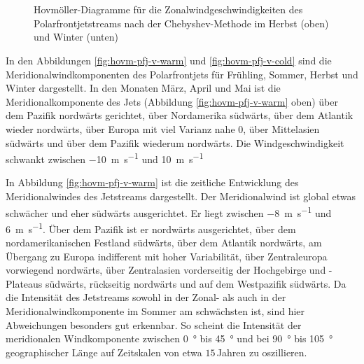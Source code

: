 \begin{figure}
  \centering
  \begin{minipage}{\textwidth}
    \centering
  \end{minipage} \\ 
    \begin{minipage}{\textwidth}
      \centering
  \end{minipage} \\ 
  \caption[Hovmöllerdiagramme des Zonalwinds des Polarfrontjets nach Chebyshev im Herbst und Winter]{Hovmöller-Diagramme für die Zonalwindgeschwindigkeiten des Polarfrontjetstreams nach der Chebyshev-Methode im Herbst (oben) und Winter (unten)} \label{fig:hovm-pfj-u-cold}
\end{figure}

In den Abbildungen \ref{fig:hovm-pfj-v-warm} und \ref{fig:hovm-pfj-v-cold} sind die Meridionalwindkomponenten des Polarfrontjets für Frühling, Sommer, Herbst und Winter dargestellt. In den Monaten März, April und Mai ist die Meridionalkomponente des Jets (Abbildung \ref{fig:hovm-pfj-v-warm} oben) über dem Pazifik nordwärts gerichtet, über Nordamerika südwärts, über dem Atlantik wieder nordwärts, über Europa mit viel Varianz nahe $0$, über Mittelasien südwärts und über dem Pazifik wiederum nordwärts. Die Windgeschwindigkeit schwankt zwischen \SI{-10}{\metre\per\second} und \SI{10}{\metre\per\second}

In Abbildung \ref{fig:hovm-pfj-v-warm} ist die zeitliche Entwicklung des Meridionalwindes des Jetstreams dargestellt. Der Meridionalwind ist global etwas schwächer und eher südwärts ausgerichtet. Er liegt zwischen \SI{-8}{\metre\per\second} und \SI{6}{\metre\per\second}. Über dem Pazifik ist er nordwärts ausgerichtet, über dem nordamerikanischen Festland südwärts, über dem Atlantik nordwärts, am Übergang zu Europa indifferent mit hoher Variabilität, über Zentraleuropa vorwiegend nordwärts, über Zentralasien vorderseitig der Hochgebirge und -Plateaus südwärts, rückseitig nordwärts und auf dem Westpazifik südwärts. Da die Intensität des Jetstreams sowohl in der Zonal- als auch in der Meridionalwindkomponente im Sommer am schwächsten ist, sind hier Abweichungen besonders gut erkennbar. So scheint die Intensität der meridionalen Windkomponente zwischen \SI{0}{\degree} bis \SI{45}{\degree} und bei \SI{90}{\degree} bis \SI{105}{\degree} geographischer Länge auf Zeitskalen von etwa $15$\,Jahren zu oszillieren.

